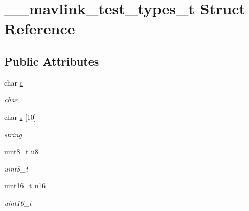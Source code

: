 \hypertarget{struct____mavlink__test__types__t}{}\section{\+\_\+\+\_\+mavlink\+\_\+test\+\_\+types\+\_\+t Struct Reference}
\label{struct____mavlink__test__types__t}
\subsection*{Public Attributes}
\begin{DoxyCompactItemize}
\item 
\mbox{\label{struct____mavlink__test__types__t_aa40c20757144c710972466c624337241}} 
char \hyperlink{struct____mavlink__test__types__t_aa40c20757144c710972466c624337241}{c}
\begin{DoxyCompactList}\small\item\em char \end{DoxyCompactList}\item 
\mbox{\label{struct____mavlink__test__types__t_a63cca099dd61babd27e117c10b94c614}} 
char \hyperlink{struct____mavlink__test__types__t_a63cca099dd61babd27e117c10b94c614}{s} \mbox{[}10\mbox{]}
\begin{DoxyCompactList}\small\item\em string \end{DoxyCompactList}\item 
\mbox{\label{struct____mavlink__test__types__t_a2e20758d4738b63791dbb565f4134a59}} 
uint8\+\_\+t \hyperlink{struct____mavlink__test__types__t_a2e20758d4738b63791dbb565f4134a59}{u8}
\begin{DoxyCompactList}\small\item\em uint8\+\_\+t \end{DoxyCompactList}\item 
\mbox{\label{struct____mavlink__test__types__t_ab2db1b1b641ed71c6ee0e351f8ac40d4}} 
uint16\+\_\+t \hyperlink{struct____mavlink__test__types__t_ab2db1b1b641ed71c6ee0e351f8ac40d4}{u16}
\begin{DoxyCompactList}\small\item\em uint16\+\_\+t \end{DoxyCompactList}\item 

\end{DoxyCompactItemize}
